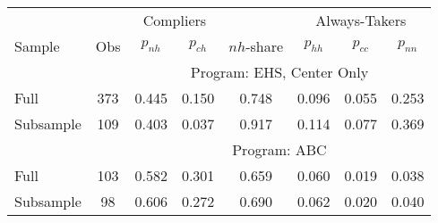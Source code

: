 \begin{tabular}{lccccccc}
\toprule 
\midrule 
\multicolumn{2}{c}{} & \multicolumn{2}{c}{Compliers} &  & \multicolumn{3}{c}{Always-Takers} \\
 \cmidrule(lr){3-4} \cmidrule(lr){6-8} 
Sample & Obs & $p_{nh}$ & $p_{ch}$ & $nh$-share & $p_{hh}$ & $p_{cc}$ & $p_{nn}$ \\
\midrule 
 &  & \multicolumn{6}{c}{Program: EHS, Center Only} \\
 \cmidrule(lr){3-8} 
Full & 373 & 0.445 & 0.150 & 0.748 & 0.096 & 0.055 & 0.253 \\
Subsample & 109 & 0.403 & 0.037 & 0.917 & 0.114 & 0.077 & 0.369 \\
\midrule 
 &  & \multicolumn{6}{c}{Program: ABC} \\
 \cmidrule(lr){3-8} 
Full & 103 & 0.582 & 0.301 & 0.659 & 0.060 & 0.019 & 0.038 \\
Subsample & 98 & 0.606 & 0.272 & 0.690 & 0.062 & 0.020 & 0.040 \\
\midrule 
\bottomrule 
\end{tabular}
